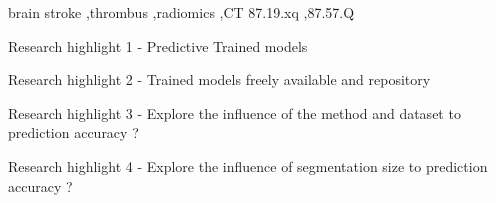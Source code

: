 \documentclass[preprint,12pt]{elsarticle}
\begin{document}
\begin{frontmatter}
\begin{abstract}
\end{abstract}

\begin{graphicalabstract}
\end{graphicalabstract}

\begin{keyword}
brain stroke \sep thrombus \sep radiomics \sep CT
87.19.xq \sep 87.57.Q

\end{keyword}

\begin{highlights} %
\item Research highlight 1 - Predictive Trained models
\item Research highlight 2 - Trained models freely available and repository
\item Research highlight 3 - Explore the influence of the method and dataset to prediction accuracy ?
\item Research highlight 4 - Explore the influence of segmentation size to prediction accuracy ?
\end{highlights}


\end{frontmatter}



\end{document}

